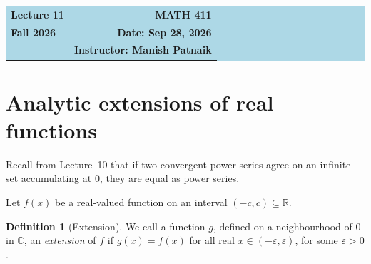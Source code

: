 \documentclass[11pt]{article}
\theoremstyle{plain}
\theoremstyle{definition}
\newtheorem{definition}[theorem]{Definition}
\theoremstyle{remark}
\numberwithin{equation}{section}
\newcommand{\C}{\mathbb{C}}
\newcommand{\R}{\mathbb{R}}
\begin{document}
\begin{center}
  \colorbox{lightblue}{%
    \begin{minipage}{0.94\textwidth}
      \vspace{0.55em}
      \begin{tabular*}{\textwidth}{@{\extracolsep{\fill}}lr}
        {\color{courseblue}\bfseries\LARGE Lecture 11} &
        {\color{courseblue}\bfseries\LARGE MATH 411}\\[0.35em]
        \textbf{Fall 2026} & \textbf{Date: Sep 28, 2026}\\
        & \textbf{Instructor: Manish Patnaik}
      \end{tabular*}
      \vspace{0.45em}
    \end{minipage}}
\end{center}

\setcounter{tocdepth}{1}
\tableofcontents
\vspace{0.45em}

\section{Analytic extensions of real functions}
Recall from Lecture~10 that if two convergent power series agree on an infinite set
accumulating at $0$, they are equal as power series.

Let $f(x)$ be a real-valued function on an interval $(-c,c)\subseteq\R$.

\noindent
\begin{minipage}[c]{0.66\textwidth}
\begin{definition}[Extension]
We call a function $g$, defined on a neighbourhood of $0$ in $\C$, an
\emph{extension} of $f$ if $g(x)=f(x)$ for all real $x\in(-\varepsilon,\varepsilon)$, for some $\varepsilon > 0$.
\end{definition}
\end{minipage}\hfill
\begin{minipage}[c]{0.3\textwidth}
\centering
{}
\end{minipage}
\end{document}
